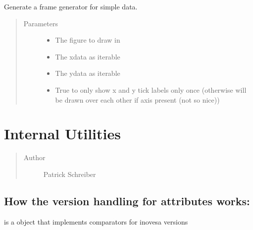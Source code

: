 \documentclass[letterpaper,10pt,openany,oneside,english]{sphinxmanual}
\begin{document}
\begin{fulllineitems}
\label{\detokenize{animation:animation.data_frame_generator}}
Generate a frame generator for simple data.
\begin{quote}\begin{description}
\item[{Parameters}] \leavevmode\begin{itemize}
\item {} 
 \textendash{} The figure to draw in

\item {} 
 \textendash{} The xdata as iterable

\item {} 
 \textendash{} The ydata as iterable

\item {} 
 \textendash{} True to only show x and y tick labels only once (otherwise will be drawn over each other if axis present (not so nice))

\end{itemize}

\end{description}\end{quote}

\end{fulllineitems}

\label{\detokenize{utils:module-utils}}

\chapter{Internal Utilities}
\label{\detokenize{utils:internal-utilities}}\label{\detokenize{utils::doc}}\label{\detokenize{utils:utils}}\begin{quote}\begin{description}
\item[{Author}] \leavevmode
Patrick Schreiber

\end{description}\end{quote}


\section{How the version handling for attributes works:}
\label{\detokenize{utils:how-the-version-handling-for-attributes-works}}
 is a object that implements comparators for inovesa versions
\end{document}
